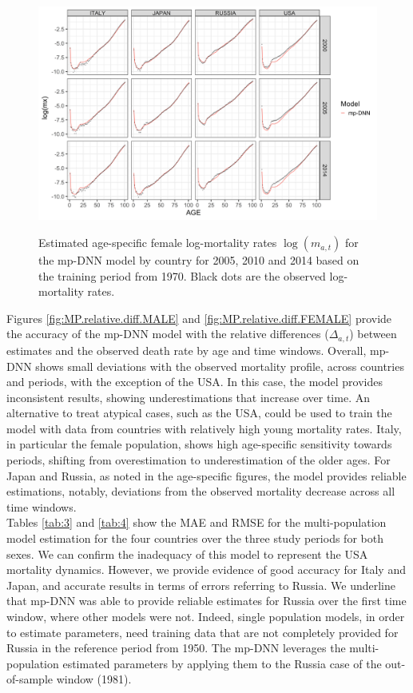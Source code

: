 \documentclass[a4,11pt]{article}
\begin{document}
\begin{figure}[H]
	\centering
	\includegraphics[width=1\linewidth]{MP_age_pattern_F_1970}\\
	 \caption{Estimated age-specific female log-mortality rates $\log(m_{a,t})$ for the mp-DNN model by country for 2005, 2010 and 2014 based on the training period from 1970. Black dots are the observed log-mortality rates.} 
	 \label{fig:MP.estimate.age.mx_F}
\end{figure}

Figures \ref{fig:MP.relative.diff.MALE} and \ref{fig:MP.relative.diff.FEMALE} provide the accuracy of the mp-DNN model with the relative differences ($\Delta_{a,t}$) between estimates and the observed death rate by age and time windows. Overall, mp-DNN shows small deviations with the observed mortality profile, across countries and periods, with the exception of the USA. In this case, the model provides inconsistent results, showing underestimations that increase over time. An alternative to treat atypical cases, such as the USA, could be used to train the model with data from countries with relatively high young mortality rates. Italy, in particular the female population, shows high age-specific sensitivity towards periods, shifting from overestimation to underestimation of the older ages. For Japan and Russia, as noted in the age-specific figures, the model provides reliable estimations, notably, deviations from the observed mortality decrease across all time windows.\\

Tables \ref{tab:3} and \ref{tab:4} show the MAE and RMSE for the multi-population model estimation for the four countries over the three study periods for both sexes. We can confirm the inadequacy of this model to represent the USA mortality dynamics. However, we provide evidence of good accuracy for Italy and Japan, and accurate results in terms of errors referring to Russia. We underline that mp-DNN was able to provide reliable estimates for Russia over the first time window, where other models were not. Indeed, single population models, in order to estimate parameters, need training data that are not completely provided for Russia in the reference period from 1950. The mp-DNN leverages the multi-population estimated parameters by applying them to the Russia case of the out-of-sample window (1981).\\
\end{document}
